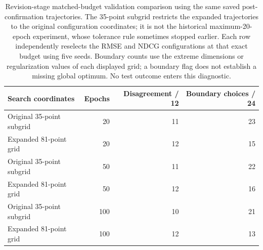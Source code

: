 \begin{table}[H]
\centering
\caption{Revision-stage matched-budget validation comparison using the same saved post-confirmation trajectories. The 35-point subgrid restricts the expanded trajectories to the original configuration coordinates; it is not the historical maximum-20-epoch experiment, whose tolerance rule sometimes stopped earlier. Each row independently reselects the RMSE and NDCG configurations at that exact budget using five seeds. Boundary counts use the extreme dimensions or regularization values of each displayed grid; a boundary flag does not establish a missing global optimum. No test outcome enters this diagnostic.}
\label{tab:matched-search}
\small
\begin{tabular}{@{}lrrr@{}}
\toprule
Search coordinates & Epochs & Disagreement / 12 & Boundary choices / 24 \\
\midrule
Original 35-point subgrid & 20 & 11 & 23 \\
Expanded 81-point grid & 20 & 12 & 15 \\
\addlinespace
Original 35-point subgrid & 50 & 11 & 22 \\
Expanded 81-point grid & 50 & 12 & 16 \\
\addlinespace
Original 35-point subgrid & 100 & 10 & 21 \\
Expanded 81-point grid & 100 & 12 & 13 \\
\bottomrule
\end{tabular}
\end{table}
